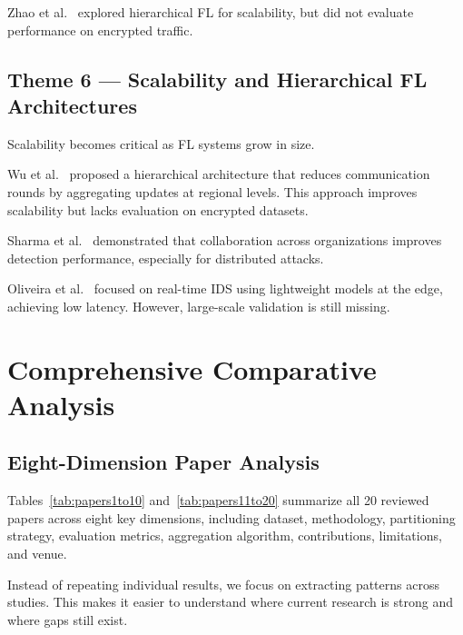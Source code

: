 \documentclass[conference]{IEEEtran}
\begin{document}
Zhao et al.~\cite{zhao2022} explored hierarchical FL for scalability, but did not evaluate performance on encrypted traffic.

\subsection{Theme 6 --- Scalability and Hierarchical FL Architectures}

Scalability becomes critical as FL systems grow in size.

Wu et al.~\cite{wu2024} proposed a hierarchical architecture that reduces communication rounds by aggregating updates at regional levels. This approach improves scalability but lacks evaluation on encrypted datasets.

Sharma et al.~\cite{sharma2024} demonstrated that collaboration across organizations improves detection performance, especially for distributed attacks.

Oliveira et al.~\cite{oliveira2022} focused on real-time IDS using lightweight models at the edge, achieving low latency. However, large-scale validation is still missing.

\section{Comprehensive Comparative Analysis}
\label{sec:analysis}

\subsection{Eight-Dimension Paper Analysis}

Tables~\ref{tab:papers1to10} and~\ref{tab:papers11to20} summarize all 20 reviewed papers across eight key dimensions, including dataset, methodology, partitioning strategy, evaluation metrics, aggregation algorithm, contributions, limitations, and venue.

Instead of repeating individual results, we focus on extracting patterns across studies. This makes it easier to understand where current research is strong and where gaps still exist.
\end{document}

